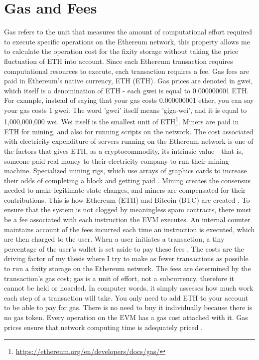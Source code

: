 \section{Gas and Fees}
\label{sec:costs}
Gas refers to the unit that measures the amount of computational effort required to execute specific operations on the Ethereum network, this property allows me to calculate the operation cost for the fixity storage without taking the price fluctuation of ETH into account. Since each Ethereum transaction requires computational resources to execute, each transaction requires a fee.
Gas fees are paid in Ethereum's native currency, ETH (ETH). Gas prices are denoted in gwei, which itself is a denomination of ETH - each gwei is equal to 0.000000001 ETH. For example, instead of saying that your gas costs 0.000000001 ether, you can say your gas costs 1 gwei. The word 'gwei' itself means 'giga-wei', and it is equal to 1,000,000,000 wei. Wei itself is the smallest unit of ETH\footnote{\url{https://ethereum.org/en/developers/docs/gas/}}.
Miners are paid in ETH for mining, and also for running scripts on the network. The cost associated with electricity expenditure of servers running on the Ethereum network is one of the factors that gives ETH, as a cryptocommodity, its intrinsic value—that is, someone paid real money to their electricity company to run their mining machine. Specialized mining rigs, which use arrays of graphics cards to increase their odds of completing a block and getting paid \cite[12]{dannen2017introducing}. 
Mining creates the consensus needed to make legitimate state changes, and miners are compensated for their contributions. This is how Ethereum (ETH) and Bitcoin (BTC) are created \cite[57]{dannen2017introducing}. 
To ensure that the system is not clogged by meaningless spam contracts, there must be a fee associated with each instruction the EVM executes. An internal counter maintains account of the fees incurred each time an instruction is executed, which are then charged to the user. When a user initiates a transaction, a tiny percentage of the user's wallet is set aside to pay these fees \cite[58]{dannen2017introducing}. The costs are the driving factor of my thesis where I try to make as fewer transactions as possible to run a fixity storage on the Ethereum network. 
The fees are determined by the transaction's gas cost; gas is a unit of effort, not a subcurrency, therefore it cannot be held or hoarded. In computer words, it simply assesses how much work each step of a transaction will take. You only need to add ETH to your account to be able to pay for gas. There is no need to buy it individually because there is no gas token. Every operation on the EVM has a gas cost attached with it. Gas prices ensure that network computing time is adequately priced \cite[59]{dannen2017introducing}.
